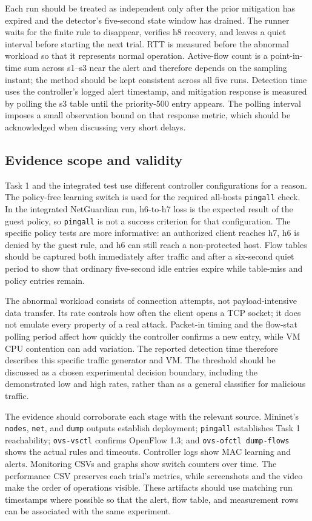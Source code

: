 \documentclass[conference]{IEEEtran}
\begin{document}
Each run should be treated as independent only after the prior mitigation has expired and the detector's five-second state window has drained. The runner waits for the finite rule to disappear, verifies h8 recovery, and leaves a quiet interval before starting the next trial. RTT is measured before the abnormal workload so that it represents normal operation. Active-flow count is a point-in-time sum across s1--s3 near the alert and therefore depends on the sampling instant; the method should be kept consistent across all five runs. Detection time uses the controller's logged alert timestamp, and mitigation response is measured by polling the s3 table until the priority-500 entry appears. The polling interval imposes a small observation bound on that response metric, which should be acknowledged when discussing very short delays.

\subsection{Evidence scope and validity}
Task 1 and the integrated test use different controller configurations for a reason. The policy-free learning switch is used for the required all-hosts \texttt{pingall} check. In the integrated NetGuardian run, h6-to-h7 loss is the expected result of the guest policy, so \texttt{pingall} is not a success criterion for that configuration. The specific policy tests are more informative: an authorized client reaches h7, h6 is denied by the guest rule, and h6 can still reach a non-protected host. Flow tables should be captured both immediately after traffic and after a six-second quiet period to show that ordinary five-second idle entries expire while table-miss and policy entries remain.

The abnormal workload consists of connection attempts, not payload-intensive data transfer. Its rate controls how often the client opens a TCP socket; it does not emulate every property of a real attack. Packet-in timing and the flow-stat polling period affect how quickly the controller confirms a new entry, while VM CPU contention can add variation. The reported detection time therefore describes this specific traffic generator and VM. The threshold should be discussed as a chosen experimental decision boundary, including the demonstrated low and high rates, rather than as a general classifier for malicious traffic.

The evidence should corroborate each stage with the relevant source. Mininet's \texttt{nodes}, \texttt{net}, and \texttt{dump} outputs establish deployment; \texttt{pingall} establishes Task 1 reachability; \texttt{ovs-vsctl} confirms OpenFlow 1.3; and \texttt{ovs-ofctl dump-flows} shows the actual rules and timeouts. Controller logs show MAC learning and alerts. Monitoring CSVs and graphs show switch counters over time. The performance CSV preserves each trial's metrics, while screenshots and the video make the order of operations visible. These artifacts should use matching run timestamps where possible so that the alert, flow table, and measurement rows can be associated with the same experiment.
\end{document}
